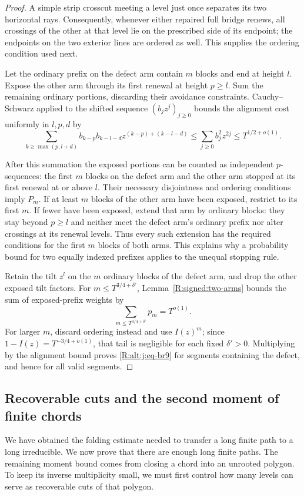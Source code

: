 \begin{proof}
A simple strip crosscut meeting a level just once separates its two
horizontal rays. Consequently, whenever either repaired full bridge
renews, all crossings of the other at that level lie on the prescribed
side of its endpoint; the endpoints on the two exterior lines are ordered
as well. This supplies the ordering condition used next.

Let the ordinary prefix on the defect arm contain $m$ blocks and end at
height $l$. Expose the other arm through its first renewal at height
$p\ge l$. Sum the remaining ordinary portions, discarding their avoidance
constraints. Cauchy--Schwarz applied to the shifted sequence
$(b_jz^j)_{j\ge0}$ bounds the alignment cost uniformly in $l,p,d$ by
\[
 \sum_{k\ge\max(p,l+d)} b_{k-p}b_{k-l-d}
          z^{(k-p)+(k-l-d)}
 \le\sum_{j\ge0}b_j^2z^{2j}\le T^{1/2+o(1)}.
\]

After this summation the exposed portions can be counted as independent
$p$-sequences: the first $m$ blocks on the defect arm and the other arm
stopped at its first renewal at or above $l$. Their necessary disjointness
and ordering conditions imply $P_m$. If at least $m$ blocks of the other
arm have been exposed, restrict to its first $m$. If fewer have been
exposed, extend that arm by ordinary blocks: they stay beyond $p\ge l$
and neither meet the defect arm's ordinary prefix nor alter crossings at
its renewal levels. Thus every such extension has the required conditions
for the first $m$ blocks of both arms. This explains why a probability
bound for two equally indexed prefixes applies to the unequal stopping
rule.

Retain the tilt $z^l$ on the $m$ ordinary blocks of the defect arm, and
drop the other exposed tilt factors. For
$m\le T^{3/4+\delta'}$, Lemma~\ref{R:signed:two-arms} bounds the sum of
exposed-prefix weights by
\[
 \sum_{m\le T^{3/4+\delta'}}p_m=T^{o(1)}.
\]
For larger $m$, discard ordering instead and use $I(z)^m$; since
$1-I(z)=T^{-3/4+o(1)}$, that tail is negligible for each fixed
$\delta'>0$. Multiplying by the alignment bound proves
\eqref{R:alt:j:eq-br9} for segments containing the defect, and hence for
all valid segments.
\end{proof}

\subsection{Recoverable cuts and the second moment of finite chords}

We have obtained the folding estimate needed to transfer a long finite
path to a long irreducible. We now prove that there are enough long finite
paths. The remaining moment bound comes from closing a chord into an
unrooted polygon. To keep its inverse multiplicity small, we must first
control how many levels can serve as recoverable cuts of that polygon.

